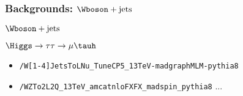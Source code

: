\begin{frame}
\frametitle{Backgrounds: $\Wboson+\text{jets}$}


\begin{minipage}[c]{.45\textwidth}
\begin{block}{$\Wboson+\text{jets}$\vphantom{ÀQj}}
\begin{center}
\end{center}
\end{block}
\end{minipage}
\hfill
\begin{minipage}[c]{.45\textwidth}
\begin{block}{$\Higgs\to\tau\tau\to\mu\tauh$\vphantom{ÀQj}}
\begin{center}
\end{center}
\end{block}
\end{minipage}

\begin{block}{}
\begin{itemize}
\item \texttt{/W[1-4]JetsToLNu\_TuneCP5\_13TeV-madgraphMLM-pythia8}
\item \texttt{/WZTo2L2Q\_13TeV\_amcatnloFXFX\_madspin\_pythia8} ...
\end{itemize}
\end{block}

\end{frame}

